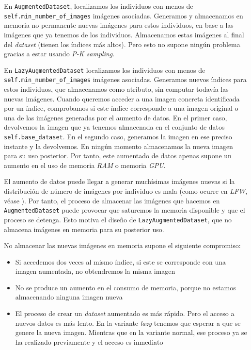 En \lstinline{AugmentedDataset}, localizamos los individuos con menos de \lstinline{self.min_number_of_images} imágenes asociadas. Generamos y almacenamos en memoria no permanente nuevas imágenes para estos individuos, en base a las imágenes que ya tenemos de los individuos. Almacenamos estas imágenes al final del \textit{dataset} (tienen los índices más altos). Pero esto no supone ningún problema gracias a estar usando \textit{P-K sampling}.

En \lstinline{LazyAugmentedDataset} localizamos los individuos con menos de \lstinline{self.min_number_of_images} imágenes asociadas. Generamos nuevos índices para estos individuos, que almacenamos como atributo, sin computar todavía las nuevas imágenes. Cuando queremos acceder a una imagen concreta identificada por un índice, comprobamos si este índice corresponde a una imagen original o una de las imágenes generadas por el aumento de datos. En el primer caso, devolvemos la imagen que ya tenemos almacenada en el conjunto de datos \lstinline{self.base_dataset}. En el segundo caso, generamos la imagen en ese preciso instante y la devolvemos. En ningún momento almacenamos la nueva imagen para su uso posterior. Por tanto, este aumentado de datos apenas supone un aumento en el uso de memoria \textit{RAM} o memoria \textit{GPU}.

El aumento de datos puede llegar a generar muchísimas imágenes nuevas si la distribución de número de imágenes por individuo es mala (como ocurre en \textit{LFW}, véase ). Por tanto, el proceso de almacenar las imágenes que hacemos en \lstinline{AugmentedDataset} puede provocar que saturemos la memoria disponible y que el proceso se detenga. Esto motiva el diseño de \lstinline{LazyAugmentedDataset}, que no almacena imágenes en memoria para su posterior uso.

No almacenar las nuevas imágenes en memoria supone el siguiente compromiso:

\begin{itemize}
    \item Si accedemos dos veces al mismo índice, si este se corresponde con una imagen aumentada, no obtendremos la misma imagen
    \item No se produce un aumento en el consumo de memoria, porque no estamos almacenando ninguna imagen nueva
    \item El proceso de crear un \textit{dataset} aumentado es más rápido. Pero el acceso a nuevos datos es más lento. En la variante \textit{lazy} tenemos que esperar a que se genere la nueva imagen. Mientras que en la variante normal, ese proceso ya se ha realizado previamente y el acceso es inmediato
\end{itemize}

